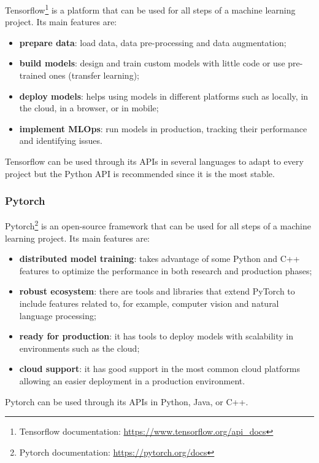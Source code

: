 Tensorflow\footnote{Tensorflow documentation: \url{https://www.tensorflow.org/api_docs}} is a platform that can be used for all steps of a machine learning project. Its main features are:
\begin{itemize}
    \item \textbf{prepare data}: load data, data pre-processing and data augmentation;
    \item \textbf{build models}: design and train custom models with little code or use pre-trained ones (transfer learning);
    \item \textbf{deploy models}: helps using models in different platforms such as locally, in the cloud, in a browser, or in mobile;
    \item \textbf{implement MLOps}: run models in production, tracking their performance and identifying issues.
\end{itemize}

Tensorflow can be used through its APIs in several languages to adapt to every project but the Python API is recommended since it is the most stable.

\subsubsection{Pytorch}

Pytorch\footnote{Pytorch documentation: \url{https://pytorch.org/docs}} is an open-source framework that can be used for all steps of a machine learning project. Its main features are:

\begin{itemize}
    \item \textbf{distributed model training}: takes advantage of some Python and C++ features to optimize the performance in both research and production phases;
    \item \textbf{robust ecosystem}: there are tools and libraries that extend PyTorch to include features related to, for example, computer vision and natural language processing;
    \item \textbf{ready for production}: it has tools to deploy models with scalability in environments such as the cloud;
    \item \textbf{cloud support}: it has good support in the most common cloud platforms allowing an easier deployment in a production environment.
\end{itemize}

Pytorch can be used through its APIs in Python, Java, or C++.

